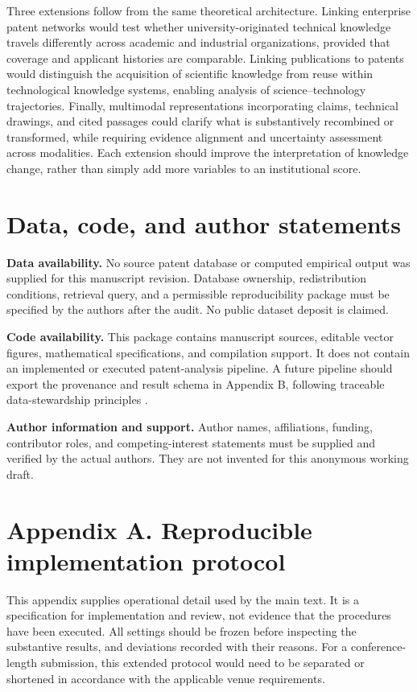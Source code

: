 Three extensions follow from the same theoretical architecture. Linking enterprise
patent networks would test whether university-originated technical knowledge
travels differently across academic and industrial organizations, provided that
coverage and applicant histories are comparable. Linking publications to patents
would distinguish the acquisition of scientific knowledge from reuse within
technological knowledge systems, enabling analysis of science--technology
trajectories. Finally, multimodal representations incorporating claims, technical
drawings, and cited passages could clarify what is substantively recombined or
transformed, while requiring evidence alignment and uncertainty assessment across
modalities. Each extension should improve the interpretation of knowledge change,
rather than simply add more variables to an institutional score.

\section*{Data, code, and author statements}
\textbf{Data availability.} No source patent database or computed empirical output
was supplied for this manuscript revision. Database ownership, redistribution
conditions, retrieval query, and a permissible reproducibility package must be
specified by the authors after the audit. No public dataset deposit is claimed.

\textbf{Code availability.} This package contains manuscript sources, editable
vector figures, mathematical specifications, and compilation support. It does
not contain an implemented or executed patent-analysis pipeline. A future
pipeline should export the provenance and result schema in
Appendix B, following traceable data-stewardship principles
\citep{wilkinson2016}.

\textbf{Author information and support.} Author names, affiliations, funding,
contributor roles, and competing-interest statements must be supplied and verified
by the actual authors. They are not invented for this anonymous working draft.

\clearpage
\appendix
\section{Appendix A. Reproducible implementation protocol}\label{app:protocol}
This appendix supplies operational detail used by the main text. It is a
specification for implementation and review, not evidence that the procedures
have been executed. All settings should be frozen before inspecting the substantive
results, and deviations recorded with their reasons. For a conference-length
submission, this extended protocol would need to be separated or shortened in
accordance with the applicable venue requirements.

